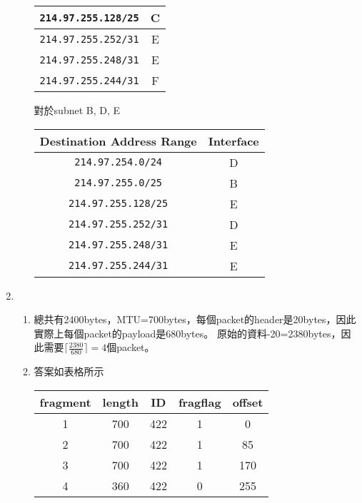 \documentclass[12pt,a4paper]{article}
\begin{document}
\begin{enumerate}
\begin{enumerate}
\begin{table}[H]
\begin{tabular}{|c|c|}
        \texttt{214.97.255.128/25}   & C \\ \hline
        \texttt{214.97.255.252/31}   & E \\ \hline
        \texttt{214.97.255.248/31}   & E \\ \hline
        \texttt{214.97.255.244/31}   & F \\ \hline
        \end{tabular}
        \end{table}
        對於subnet B, D, E
        \begin{table}[H]
        \centering
        \begin{tabular}{|c|c|}
        \hline
        \textbf{Destination Address Range} & \textbf{Interface} \\ \hline
        \texttt{214.97.254.0/24}     & D \\ \hline
        \texttt{214.97.255.0/25}     & B \\ \hline
        \texttt{214.97.255.128/25}   & E \\ \hline
        \texttt{214.97.255.252/31}   & D \\ \hline
        \texttt{214.97.255.248/31}   & E \\ \hline
        \texttt{214.97.255.244/31}   & E \\ \hline
        \end{tabular}
        \end{table}

    \end{enumerate}

    \item \begin{enumerate}
        \item 總共有2400bytes，MTU=700bytes，每個packet的header是20bytes，因此實際上每個packet的payload是680bytes。
        原始的資料-20=2380bytes，因此需要\(\lceil \frac{2380}{680} \rceil = 4\)個packet。
        \item 答案如表格所示
        \begin{table}[H]
        \centering
        \begin{tabular}{|c|c|c|c|c|}
        \hline
        \textbf{fragment} & \textbf{length} & \textbf{ID} & \textbf{fragflag} & \textbf{offset} \\ \hline
        1 & 700 & 422 & 1 & 0 \\ \hline
        2 & 700 & 422 & 1 & 85 \\ \hline
        3 & 700 & 422 & 1 & 170 \\ \hline
        4 & 360 & 422 & 0 & 255 \\ \hline
        \end{tabular}
        \end{table}


\end{enumerate}
\end{enumerate}
\end{document}
